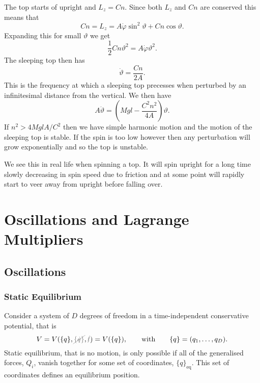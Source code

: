 \documentclass[fleqn]{NotesClass}
\newcommand*{\nodependence}[1]{\textcolor{gray}{\cancel{#1}}}
\begin{document}
    The top starts of upright and \(L_z = Cn\).
    Since both \(L_z\) and \(Cn\) are conserved this means that
    \begin{equation}
        Cn = L_z = A \dot{\varphi}\sin^2\vartheta + Cn\cos\vartheta.
    \end{equation}
    Expanding this for small \(\vartheta\) we get
    \begin{equation}
        \frac{1}{2}Cn\vartheta^2 = A\dot{\varphi}\vartheta^2.
    \end{equation}
    The sleeping top then has
    \begin{equation}
        \dot{\vartheta} = \frac{Cn}{2A}.
    \end{equation}
    This is the frequency at which a sleeping top precesses when perturbed by an infinitesimal distance from the vertical.
    We then have
    \begin{equation}
        A\ddot{\vartheta} = \left( Mgl - \frac{C^2n^2}{4A} \right)\vartheta.
    \end{equation}
    If \(n^2 > 4MglA/C^2\) then we have simple harmonic motion and the motion of the sleeping top is stable.
    If the spin is too low however then any perturbation will grow exponentially and so the top is unstable.
    
    We see this in real life when spinning a top.
    It will spin upright for a long time slowly decreasing in spin speed due to friction and at some point will rapidly start to veer away from upright before falling over.
    
    \part{Oscillations and Lagrange Multipliers}
    \chapter{Oscillations}
    \section{Static Equilibrium}
    Consider a system of \(D\) degrees of freedom in a time-independent conservative potential, that is
    \begin{equation}
        V = V(\{q\}, \nodependence{\{\dot{q}\}}, \nodependence{t}) = V(\{q\}), \qquad\text{with}\qquad \{q\} = (q_1, \dotsc, q_D).
    \end{equation}
    Static equilibrium, that is no motion, is only possible if all of the generalised forces, \(Q_i\), vanish together for some set of coordinates, \(\{q\}_{\mathrm{eq}}\).
    This set of coordinates defines an equilibrium position.
    
\end{document}
